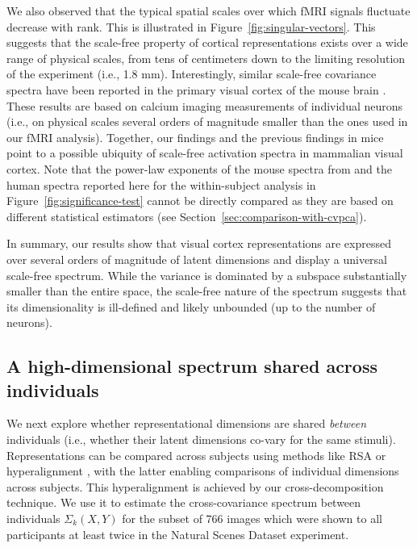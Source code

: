 \documentclass[10pt]{article}
\begin{document}
We also observed that the typical spatial scales over which fMRI signals fluctuate decrease with rank. This is illustrated in Figure~\ref{fig:singular-vectors}. This suggests that the scale-free property of cortical representations exists over a wide range of physical scales, from tens of centimeters down to the limiting resolution of the experiment (i.e., 1.8 mm). Interestingly, similar scale-free covariance spectra have been reported in the primary visual cortex of the mouse brain \autocite{Stringer2019}. These results are based on calcium imaging measurements of individual neurons (i.e., on physical scales several orders of magnitude smaller than the ones used in our fMRI analysis). Together, our findings and the previous findings in mice point to a possible ubiquity of scale-free activation spectra in mammalian visual cortex. Note that the power-law exponents of the mouse spectra from \textcite{Stringer2019} and the human spectra reported here for the within-subject analysis in Figure~\ref{fig:significance-test} cannot be directly compared as they are based on different statistical estimators (see Section~\ref{sec:comparison-with-cvpca}).

In summary, our results show that visual cortex representations are expressed over several orders of magnitude of latent dimensions and display a universal scale-free spectrum. While the variance is dominated by a subspace substantially smaller than the entire space, the scale-free nature of the spectrum suggests that its dimensionality is ill-defined and likely unbounded (up to the number of neurons).

\subsection{A high-dimensional spectrum shared across individuals}\label{a-high-dimensional-spectrum-shared-across-individuals}

We next explore whether representational dimensions are shared \emph{between} individuals (i.e., whether their latent dimensions co-vary for the same stimuli). Representations can be compared across subjects using methods like RSA \autocite{Kriegeskorte2008} or hyperalignment \autocite{Haxby2011}, with the latter enabling comparisons of individual dimensions across subjects. This hyperalignment is achieved by our cross-decomposition technique. We use it to estimate the cross-covariance spectrum between individuals \(\Sigma_k(X, Y)\) for the subset of 766 images which were shown to all participants at least twice in the Natural Scenes Dataset experiment.
\end{document}
